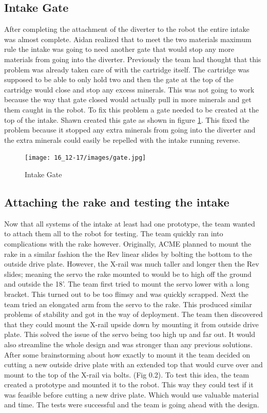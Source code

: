 \documentclass{article}
\begin{document}
\subsection{Intake Gate}
After completing the attachment of the diverter to the robot the entire intake was almost complete. Aidan realized that to meet the two materials maximum rule the intake was going to need another gate that would stop any more materials from going into the diverter. Previously the team had thought that this problem was already taken care of with the cartridge itself. The cartridge was supposed to be able to only hold two and then the gate at the top of the cartridge would close and stop any excess minerals. This was not going to work because the way that gate closed would actually pull in more minerals and get them caught in the robot. To fix this problem a gate needed to be created at the top of the intake. Shawn created this gate as shown in figure \ref{fig:gate}. This fixed the problem because it stopped any extra minerals from going into the diverter and the extra minerals could easily be repelled with the intake running reverse.

\begin{figure}
    \centering
    \texttt{[image: 16\_12-17/images/gate.jpg]}
    \caption{Intake Gate}
    \label{fig:gate}
\end{figure}

\subsection{Attaching the rake and testing the intake}
Now that all systems of the intake at least had one prototype, the team wanted to attach them all to the robot for testing. The team quickly ran into complications with the rake however. Originally, ACME planned to mount the rake in a similar fashion the the Rev linear slides by bolting the bottom to the outside drive plate. However, the X-rail was much taller and longer then the Rev slides; meaning the servo the rake mounted to would be to high off the ground and outside the 18'. The team first tried to mount the servo lower with a long bracket. This turned out to be too flimsy and was quickly scrapped. Next the team tried an elongated arm from the servo to the rake. This produced similar problems of stability and got in the way of deployment. The team then discovered that they could mount the X-rail upside down by mounting it from outside drive plate. This solved the issue of the servo being too high up and far out. It would also streamline the whole design and was stronger than any previous solutions. After some brainstorming about how exactly to mount it the team decided on cutting a new outside drive plate with an extended top that would curve over and mount to the top of the X-rail via bolts. (Fig 0.2). To test this idea, the team created a prototype and mounted it to the robot. This way they could test if it was feasible before cutting a new drive plate. Which would use valuable material and time. The tests were successful and the team is going ahead with the design. 
\end{document}
